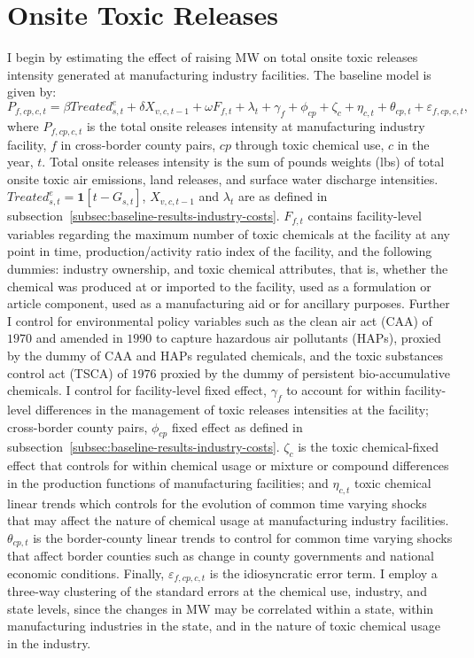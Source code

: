 \documentclass[12pt, english]{article}
\begin{document}
    \section{Onsite Toxic Releases}\label{sec:onsite-toxic-releases}
    I begin by estimating the effect of raising MW on total onsite toxic releases intensity generated at manufacturing industry facilities. The baseline model is given by:
    \begin{equation}
        P_{f,cp,c,t} = \beta Treated_{s,t}^e + \delta X_{v,c,t-1} + \omega F_{f,t} + \lambda_{t} + \gamma_{f} + \phi_{cp} + \zeta_{c} + \eta_{c,t} + \theta_{cp,t} + \varepsilon_{f,cp,c,t},\label{eq:baseline-total-onsite-releases-intensity}
    \end{equation}
    where $P_{f,cp,c,t}$ is the total onsite releases intensity at manufacturing industry facility, $f$ in cross-border county pairs, $cp$ through toxic chemical use, $c$ in the year, $t$. Total onsite releases intensity is the sum of pounds weights (lbs) of total onsite toxic air emissions, land releases, and surface water discharge intensities. $Treated_{s,t}^e = \textbf{1}[t - G_{s,t}]$, $X_{v,c,t-1}$ and $\lambda_{t}$ are as defined in subsection~\ref{subsec:baseline-results-industry-costs}. $F_{f,t}$ contains facility-level variables regarding the maximum number of toxic chemicals at the facility at any point in time, production/activity ratio index of the facility, and the following dummies: industry ownership, and toxic chemical attributes, that is, whether the chemical was produced at or imported to the facility, used as a formulation or article component, used as a manufacturing aid or for ancillary purposes. Further I control for environmental policy variables such as the clean air act (CAA) of $1970$ and amended in $1990$ to capture hazardous air pollutants (HAPs), proxied by the dummy of CAA and HAPs regulated chemicals, and the toxic substances control act (TSCA) of $1976$ proxied by the dummy of persistent bio-accumulative chemicals. I control for facility-level fixed effect, $\gamma_{f}$ to account for within facility-level differences in the management of toxic releases intensities at the facility; cross-border county pairs, $\phi_{cp}$ fixed effect as defined in subsection~\ref{subsec:baseline-results-industry-costs}. $\zeta_{c}$ is the toxic chemical-fixed effect that controls for within chemical usage or mixture or compound differences in the production functions of manufacturing facilities; and $\eta_{c,t}$ toxic chemical linear trends which controls for the evolution of common time varying shocks that may affect the nature of chemical usage at manufacturing industry facilities. $\theta_{cp,t}$ is the border-county linear trends to control for common time varying shocks that affect border counties such as change in county governments and national economic conditions. Finally, $\varepsilon_{f,cp,c,t}$ is the idiosyncratic error term. I employ a three-way clustering of the standard errors at the chemical use, industry, and state levels, since the changes in MW may be correlated within a state, within manufacturing industries in the state, and in the nature of toxic chemical usage in the industry.
    
\end{document}
